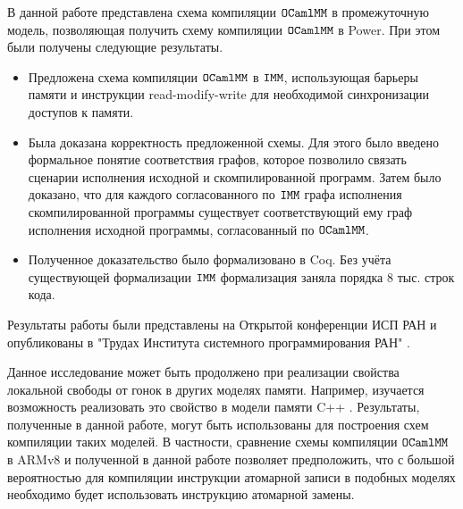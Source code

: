 В данной работе представлена схема компиляции $\mathtt{OCaml}\allowbreak \mathtt{MM}$ в промежуточную модель, позволяющая получить схему компиляции $\mathtt{OCaml}\allowbreak \mathtt{MM}$ в Power. При этом были получены следующие результаты.

\begin{itemize}
\item Предложена схема компиляции $\mathtt{OCaml}\allowbreak \mathtt{MM}$ в $\mathtt{IMM}$, использующая барьеры памяти и инструкции read-modify-write для необходимой синхронизации доступов к памяти. 
\item Была доказана корректность предложенной схемы. Для этого было введено формальное понятие соответствия графов, которое позволило связать сценарии исполнения исходной и скомпилированной программ. Затем было доказано, что для каждого согласованного по $\mathtt{IMM}$ графа исполнения скомпилированной программы существует соответствующий ему граф исполнения исходной программы, согласованный по $\mathtt{OCaml}\allowbreak \mathtt{MM}$. 
\item Полученное доказательство было формализовано в Coq. Без учёта существующей формализации $\mathtt{IMM}$ формализация заняла порядка 8 тыс. строк кода. 
\end{itemize}

Результаты работы были представлены на Открытой конференции ИСП РАН и опубликованы в "Трудах Института системного программирования РАН" \cite{publication}. 

Данное исследование может быть продолжено при реализации свойства локальной свободы от гонок в других моделях памяти. Например, изучается возможность реализовать это свойство в модели памяти C++ \cite{ldrf-c11}. Результаты, полученные в данной работе, могут быть использованы для построения схем компиляции таких моделей. В частности, сравнение схемы компиляции $\mathtt{OCaml}\allowbreak \mathtt{MM}$ в ARMv8 \cite{omm} и полученной в данной работе позволяет предположить, что с большой вероятностью для компиляции инструкции атомарной записи в подобных моделях необходимо будет использовать инструкцию атомарной замены.





